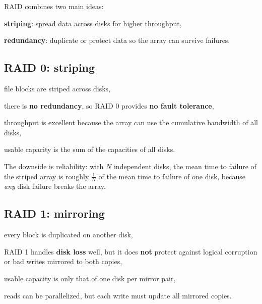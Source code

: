 \documentclass[../../dis.tex]{subfiles}
\begin{document}
RAID combines two main ideas:
\begin{dashlist}
    \item \textbf{striping}: spread data across disks for higher throughput,
    \item \textbf{redundancy}: duplicate or protect data so the array can survive failures.
\end{dashlist}

\subsection{RAID 0: striping}
\begin{dashlist}
    \item file blocks are striped across disks,
    \item there is \textbf{no redundancy}, so RAID 0 provides \textbf{no fault tolerance},
    \item throughput is excellent because the array can use the cumulative bandwidth of all disks,
    \item usable capacity is the sum of the capacities of all disks.
\end{dashlist}

\begin{schema}
{}\par}
\end{schema}

The downside is reliability: with \(N\) independent disks, the mean time to failure of the striped array is roughly \(\frac{1}{N}\) of the mean time to failure of one disk, because \emph{any} disk failure breaks the array.

\subsection{RAID 1: mirroring}
\begin{dashlist}
    \item every block is duplicated on another disk,
    \item RAID 1 handles \textbf{disk loss} well, but it does \textbf{not} protect against logical corruption or bad writes mirrored to both copies,
    \item usable capacity is only that of one disk per mirror pair,
    \item reads can be parallelized, but each write must update all mirrored copies.
\end{dashlist}
\end{document}
